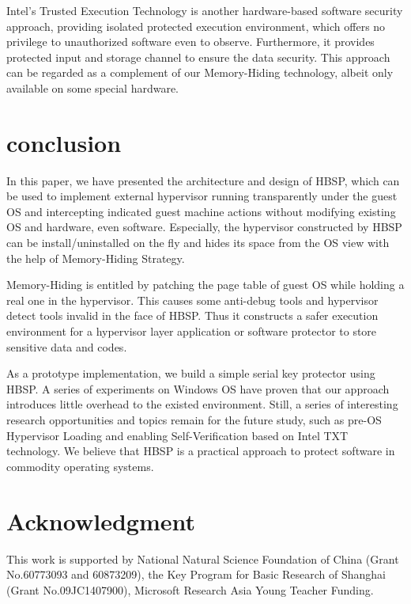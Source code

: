 \documentclass[conference]{IEEEtran}
\begin{document}
{Intel's Trusted Execution Technology\cite{IEEEhowto:17} is another
hardware-based software security approach, providing isolated
protected execution environment, which offers no privilege to
unauthorized software even to observe. Furthermore, it provides
protected input and storage channel to ensure the data security.
This approach can be regarded as a complement of our Memory-Hiding
technology, albeit only available on some special hardware.

\bigskip

\section{conclusion}
In this paper, we have presented the architecture and design of
HBSP, which can be used to implement external hypervisor running
transparently under the guest OS and intercepting indicated guest
machine actions without modifying existing OS and hardware, even
software. Especially, the hypervisor constructed by HBSP can be
install/uninstalled on the fly and hides its space from the OS
view with the help of Memory-Hiding Strategy.

Memory-Hiding is entitled by patching the page table of guest OS
while holding a real one in the hypervisor. This causes some
anti-debug tools and hypervisor detect tools invalid in the face
of HBSP. Thus it constructs a safer execution environment for a
hypervisor layer application or software protector to store
sensitive data and codes.

As a prototype implementation, we build a simple serial key
protector using HBSP. A series of experiments on Windows OS have
proven that our approach introduces little overhead to the existed
environment. Still, a series of interesting research opportunities
and topics remain for the future study, such as pre-OS Hypervisor
Loading and enabling Self-Verification based on Intel TXT
technology. We believe that HBSP is a practical approach to protect
software in commodity operating systems.
\bigskip

\section*{Acknowledgment}
This work is supported by National Natural Science Foundation of
China (Grant No.60773093 and 60873209), the Key Program for Basic
Research of Shanghai (Grant No.09JC1407900), Microsoft Research Asia
Young Teacher Funding.

\bigskip

}
\end{document}
